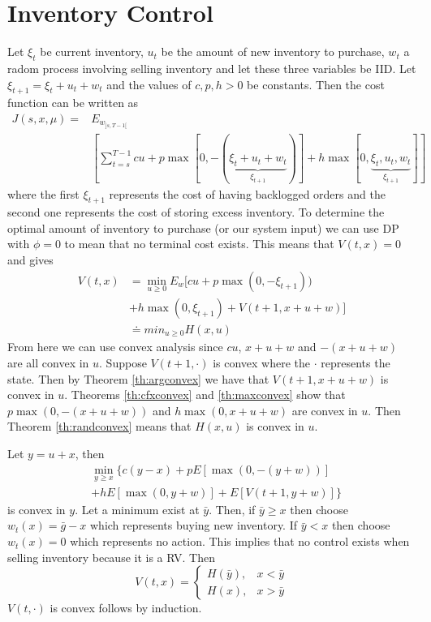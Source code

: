 \documentclass[lecture,12pt,]{pcms-l}
\begin{document}
\section{Inventory Control}
Let $\xi_t$ be current inventory, $u_t$ be the amount of new inventory to purchase, $w_t$ a radom process involving selling inventory and let these three variables be IID. Let $\xi_{t+1} = \xi_t+u_t+w_t$ and the values of $c,p,h>0$ be constants. Then the cost function can be written as
\begin{align*}
J(s,x,\mu) =& E_{w_{]s,T-1[}} \\
&\left[\sum_{t=s}^{T-1}cu+p\max[0,-(\underbrace{\xi_t+u_t+w_t}_{\xi_{t+1}})] + h\max[0,\underbrace{\xi_t,u_t,w_t}_{\xi_{t+1}}] \right]
\end{align*}
where the first $\xi_{t+1}$ represents the cost of having backlogged orders and the second one represents the cost of storing excess inventory. To determine the optimal amount of inventory to purchase (or our system input) we can use DP with $\phi=0$ to mean that no terminal cost exists. This means that $V(t,x)=0$ and gives
\begin{align*}
V(t,x) &= \min_{u\geq 0}E_w[cu+p\max(0,-\xi_{t+1})) \\
&+ h\max(0,\xi_{t+1}) + V(t+1,x+u+w)] \\
&\doteq min_{u\geq 0}H(x,u)
\end{align*}
From here we can use convex analysis since $cu$, $x+u+w$ and $-(x+u+w)$ are all convex in $u$. Suppose $V(t+1,\cdot)$ is convex where the $\cdot$ represents the state. Then by Theorem \ref{th:argconvex} we have that $V(t+1,x+u+w)$ is convex in $u$. Theorems \ref{th:cfxconvex} and \ref{th:maxconvex} show that $p\max(0,-(x+u+w))$ and $h\max(0,x+u+w)$ are convex in $u$. Then Theorem \ref{th:randconvex} means that $H(x,u)$ is convex in $u$.

Let $y=u+x$, then
\begin{align*}
&\min_{y\geq x}\{ c(y-x)+pE[\max(0,-(y+w))] \\
&+ hE[\max(0,y+w)] + E[V(t+1,y+w)]\}
\end{align*}
is convex in $y$. Let a minimum exist at $\bar{y}$. Then, if $\bar{y}\geq x$ then choose $w_t(x) = \bar{g}-x$ which represents buying new inventory. If $\bar{y}<x$ then choose $w_t(x)=0$ which represents no action. This implies that no control exists when selling inventory because it is a RV. Then
$$V(t,x) = \begin{cases} H(\bar{y}), & x<\bar{y} \\ H(x), & x>\bar{y} \end{cases}$$
$V(t,\cdot)$ is convex follows by induction.
\end{document}
